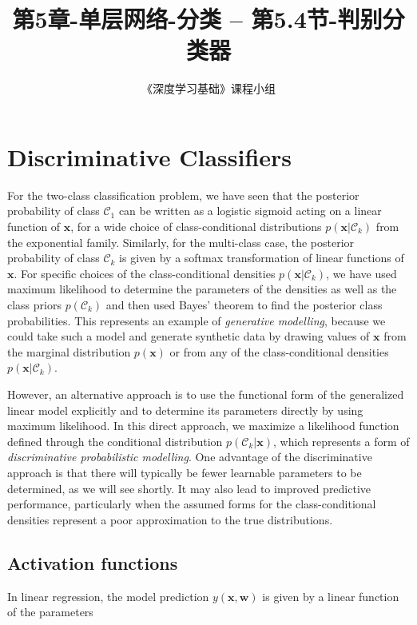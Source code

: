 \documentclass{article}
\title{第5章-单层网络-分类 -- 第5.4节-判别分类器}
\author{《深度学习基础》课程小组}
\begin{document}
\maketitle
\tableofcontents

\section{Discriminative Classifiers}

For the two-class classification problem, we have seen that the posterior probability of class $\mathcal{C}_{1}$ can be written as a logistic sigmoid acting on a linear function of $\mathbf{x}$, for a wide choice of class-conditional distributions $p(\mathbf{x}|\mathcal{C}_{k})$ from the exponential family. Similarly, for the multi-class case, the posterior probability of class $\mathcal{C}_{k}$ is given by a softmax transformation of linear functions of $\mathbf{x}$. For specific choices of the class-conditional densities $p(\mathbf{x}|\mathcal{C}_{k})$, we have used maximum likelihood to determine the parameters of the densities as well as the class priors $p(\mathcal{C}_{k})$ and then used Bayes' theorem to find the posterior class probabilities. This represents an example of \textit{generative modelling}, because we could take such a model and generate synthetic data by drawing values of $\mathbf{x}$ from the marginal distribution $p(\mathbf{x})$ or from any of the class-conditional densities $p(\mathbf{x}|\mathcal{C}_{k})$.

However, an alternative approach is to use the functional form of the generalized linear model explicitly and to determine its parameters directly by using maximum likelihood. In this direct approach, we maximize a likelihood function defined through the conditional distribution $p(\mathcal{C}_{k}|\mathbf{x})$, which represents a form of \textit{discriminative probabilistic modelling}. One advantage of the discriminative approach is that there will typically be fewer learnable parameters to be determined, as we will see shortly. It may also lead to improved predictive performance, particularly when the assumed forms for the class-conditional densities represent a poor approximation to the true distributions.

\subsection{Activation functions}

In linear regression, the model prediction $y(\mathbf{x},\mathbf{w})$ is given by a linear function of the parameters
\end{document}

